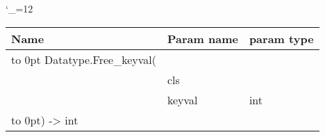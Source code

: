 \begingroup \catcode`\_=12 \tt
\begin{tabular}{lll}
\toprule
\textrm{Name}&\textrm{Param name}&\textrm{param type}\\
\midrule
\hbox to 0pt {Datatype.Free_keyval(\hss}\\
& cls\\
& keyval & int\\
\hbox to 0pt{) -> int\hss}\\
\bottomrule
\end{tabular}
\endgroup
